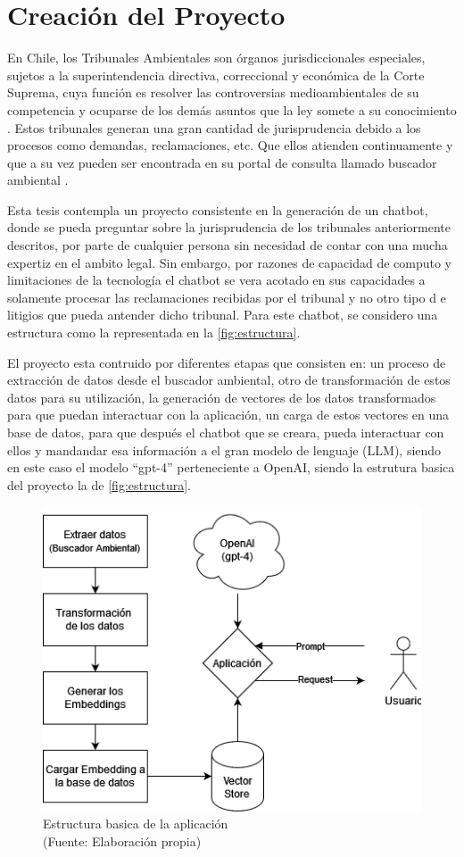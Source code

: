 

\chapter{Creación del Proyecto}


En Chile, los Tribunales Ambientales son órganos jurisdiccionales especiales, sujetos a la 
superintendencia directiva, correccional y económica de la Corte Suprema, cuya función 
es resolver las controversias medioambientales de su competencia y ocuparse de los 
demás asuntos que la ley somete a su conocimiento \cite{Ley20600}. Estos tribunales generan una gran cantidad 
de jurisprudencia debido a los procesos como demandas, reclamaciones, etc. Que ellos atienden continuamente 
y que a su vez pueden ser encontrada en su portal de consulta llamado buscador ambiental \cite{BuscadorAmbiental}. 

Esta tesis contempla un proyecto consistente en la generación de un chatbot, donde se pueda preguntar sobre 
la jurisprudencia de los tribunales anteriormente descritos, por parte de cualquier persona sin necesidad de 
contar con una mucha expertiz en el ambito legal. Sin embargo, por razones de capacidad de computo y limitaciones 
de la tecnología el chatbot se 
vera acotado en sus capacidades a solamente procesar las reclamaciones recibidas por el tribunal y no otro tipo d
e litigios que pueda antender dicho tribunal. Para este chatbot, se considero una estructura como 
la representada en la \autoref{fig:estructura}.

El proyecto esta contruido por diferentes etapas que consisten en: un proceso de extracción de datos 
desde el buscador ambiental, otro de transformación de estos datos para su utilización, la generación 
de vectores de los datos transformados para que puedan interactuar con la aplicación, un carga de estos vectores 
en una base de datos, para que después el chatbot que se creara, pueda interactuar con ellos y mandandar 
esa información a el gran modelo de lenguaje (LLM), siendo en este caso el modelo ``gpt-4'' perteneciente a OpenAI,
 siendo la estrutura basica del proyecto la de \autoref{fig:estructura}.
\begin{figure}[ht!]
    \centering
    \includegraphics[width=.47\textwidth]{figures/huemul1.png}
    \caption[Estructura basica de la aplicación]{Estructura basica de la aplicación\\
    {\scriptsize (Fuente: Elaboración propia)}}
    \label{fig:estructura}
\end{figure}
    

